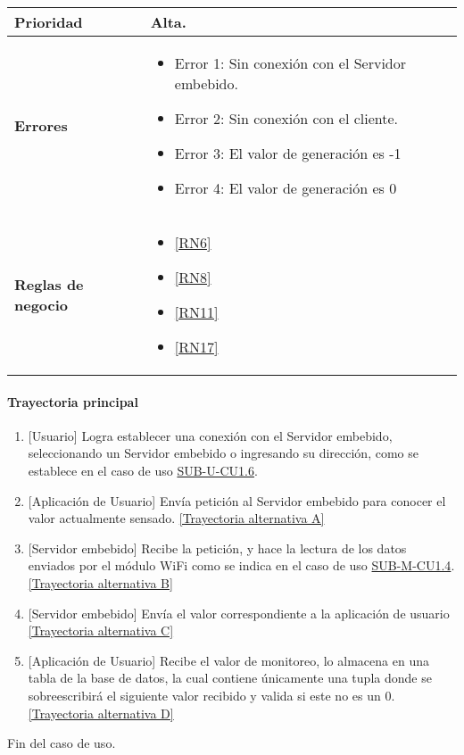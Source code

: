 \begin{longtable}{|J{5cm}|J{10.3cm}|}
	\textbf{Prioridad} & 
		Alta. \\ \hline
	\textbf{Errores} & 
		\begin{itemize}
		    \item \label{CUU1.8:Error1} Error 1: Sin conexión con el Servidor embebido.
		    \item \label{CUU1.8:Error2} Error 2: Sin conexión con el cliente.
		    \item \label{CUU1.8:Error3} Error 3: El valor de generación es -1
		    \item \label{CUU1.8:Error4} Error 4: El valor de generación es 0
		\end{itemize} \\ \hline
	\textbf{Reglas de negocio} & 
		\begin{itemize}
		    \item \ref{RN6}
			\item \ref{RN8}
			\item \ref{RN11}
			\item \ref{RN17}
		\end{itemize} \\ \hline
\end{longtable}

\paragraph{Trayectoria principal}\label{SUB-U-CU1.8:TP}
    \label{SUB-U-CU1.8:TP}
	\begin{enumerate}
	    \item {[Usuario]} Logra establecer una conexión con el Servidor embebido, seleccionando un Servidor embebido o ingresando su dirección, como se establece en el caso de uso \hyperref[SUB-U-CU1.6]{SUB-U-CU1.6}.
	    \item {[Aplicación de Usuario]} Envía petición al Servidor embebido para conocer el valor actualmente sensado. \hyperref[SUB-U-CU1.8:TA]{[Trayectoria alternativa A]} 
	    \item {[Servidor embebido]} Recibe la petición, y hace la lectura de los datos enviados por el módulo WiFi como se indica en el caso de uso  \hyperref[SUB-M-CU1.4]{SUB-M-CU1.4}. \hyperref[SUB-U-CU1.8:TB]{[Trayectoria alternativa B]}
	    \item {[Servidor embebido]} Envía el valor correspondiente a la aplicación de usuario \hyperref[SUB-U-CU1.8:TC]{[Trayectoria alternativa C]} 
	    \item {[Aplicación de Usuario]} Recibe el valor de monitoreo, lo almacena en una tabla de la base de datos, la cual contiene únicamente una tupla donde se sobreescribirá el siguiente valor recibido y valida si este no es un 0. \hyperref[SUB-U-CU1.8:TD]{[Trayectoria alternativa D]}
	\end{enumerate}
	Fin del caso de uso.



